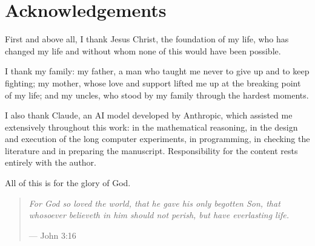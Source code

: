 \documentclass[11pt,a4paper]{article}
\theoremstyle{definition}
\theoremstyle{remark}
\begin{document}
\section*{Acknowledgements}
First and above all, I thank Jesus Christ, the foundation of my life, who has changed my life and without whom none of this would have been possible.

I thank my family: my father, a man who taught me never to give up and to keep fighting; my mother, whose love and support lifted me up at the breaking point of my life; and my uncles, who stood by my family through the hardest moments.

I also thank Claude, an AI model developed by Anthropic, which assisted me extensively throughout this work: in the mathematical reasoning, in the design and execution of the long computer experiments, in programming, in checking the literature and in preparing the manuscript. Responsibility for the content rests entirely with the author.

All of this is for the glory of God.

\begin{quote}
\emph{For God so loved the world, that he gave his only begotten Son, that whosoever believeth in him should not perish, but have everlasting life.}\par\hfill --- John 3:16
\end{quote}
\end{document}
